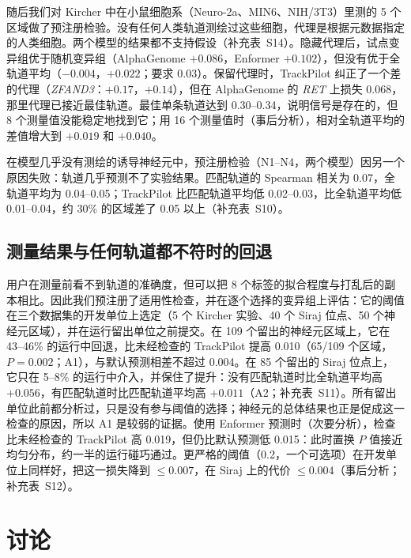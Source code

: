 \documentclass[webpdf,contemporary,large]{oup-authoring-template}
\newcommand{\tp}{TrackPilot}
\begin{document}
随后我们对 Kircher 中在小鼠细胞系（Neuro-2a、MIN6、NIH/3T3）里测的 5 个区域做了预注册检验。没有任何人类轨道测绘过这些细胞，代理是根据元数据指定的人类细胞。两个模型的结果都不支持假设（补充表~S14）。隐藏代理后，试点变异组优于随机变异组（AlphaGenome $+0.086$，Enformer $+0.102$），但没有优于全轨道平均（$-0.004$，$+0.022$；要求 0.03）。保留代理时，\tp{} 纠正了一个差的代理（\textit{ZFAND3}：$+0.17$，$+0.14$），但在 AlphaGenome 的 \textit{RET} 上损失 0.068，那里代理已接近最佳轨道。最佳单条轨道达到 0.30--0.34，说明信号是存在的，但 8 个测量值没能稳定地找到它；用 16 个测量值时（事后分析），相对全轨道平均的差值增大到 $+0.019$ 和 $+0.040$。

在模型几乎没有测绘的诱导神经元中，预注册检验（N1--N4，两个模型）因另一个原因失败：轨道几乎预测不了实验结果。匹配轨道的 Spearman 相关为 0.07，全轨道平均为 0.04--0.05；\tp{} 比匹配轨道平均低 0.02--0.03，比全轨道平均低 0.01--0.04，约 30\% 的区域差了 0.05 以上（补充表~S10）。

\subsection{测量结果与任何轨道都不符时的回退}
\label{sec:boundary}

用户在测量前看不到轨道的准确度，但可以把 8 个标签的拟合程度与打乱后的副本相比。因此我们预注册了适用性检查，并在逐个选择的变异组上评估：它的阈值在三个数据集的开发单位上选定（5 个 Kircher 实验、40 个 Siraj 位点、50 个神经元区域），并在运行留出单位之前提交。在 109 个留出的神经元区域上，它在 43--46\% 的运行中回退，比未经检查的 \tp{} 提高 0.010（65/109 个区域，$P = 0.002$；A1），与默认预测相差不超过 0.004。在 85 个留出的 Siraj 位点上，它只在 5--8\% 的运行中介入，并保住了提升：没有匹配轨道时比全轨道平均高 $+0.056$，有匹配轨道时比匹配轨道平均高 $+0.011$（A2；补充表~S11）。所有留出单位此前都分析过，只是没有参与阈值的选择；神经元的总体结果也正是促成这一检查的原因，所以 A1 是较弱的证据。使用 Enformer 预测时（次要分析），检查比未经检查的 \tp{} 高 0.019，但仍比默认预测低 0.015：此时置换 $P$ 值接近均匀分布，约一半的运行碰巧通过。更严格的阈值（0.2，一个可选项）在开发单位上同样好，把这一损失降到 $\le 0.007$，在 Siraj 上的代价 $\le 0.004$（事后分析；补充表~S12）。

\section{讨论}
\end{document}
